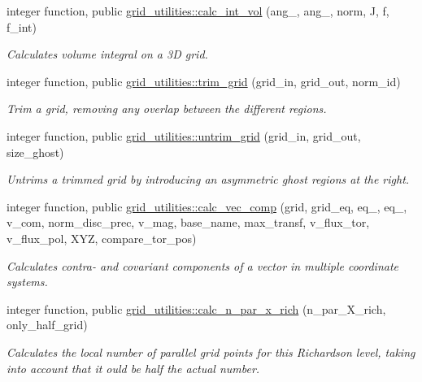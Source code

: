\begin{DoxyCompactItemize}
integer function, public \hyperlink{namespacegrid__utilities_a97e3106dbdc10b726af74afa113ba533}{grid\+\_\+utilities\+::calc\+\_\+int\+\_\+vol} (ang\+\_, ang\+\_, norm, J, f, f\+\_\+int)
\begin{DoxyCompactList}\small\item\em Calculates volume integral on a 3D grid. \end{DoxyCompactList}\item 
integer function, public \hyperlink{namespacegrid__utilities_a67001ff9bbcad707aacf17f90a748d90}{grid\+\_\+utilities\+::trim\+\_\+grid} (grid\+\_\+in, grid\+\_\+out, norm\+\_\+id)
\begin{DoxyCompactList}\small\item\em Trim a grid, removing any overlap between the different regions. \end{DoxyCompactList}\item 
integer function, public \hyperlink{namespacegrid__utilities_a4679f24af8e02793070f4e27b43e00b6}{grid\+\_\+utilities\+::untrim\+\_\+grid} (grid\+\_\+in, grid\+\_\+out, size\+\_\+ghost)
\begin{DoxyCompactList}\small\item\em Untrims a trimmed grid by introducing an asymmetric ghost regions at the right. \end{DoxyCompactList}\item 
integer function, public \hyperlink{namespacegrid__utilities_ad3d9386b9abcb1a7e17369a1b3a3750d}{grid\+\_\+utilities\+::calc\+\_\+vec\+\_\+comp} (grid, grid\+\_\+eq, eq\+\_, eq\+\_, v\+\_\+com, norm\+\_\+disc\+\_\+prec, v\+\_\+mag, base\+\_\+name, max\+\_\+transf, v\+\_\+flux\+\_\+tor, v\+\_\+flux\+\_\+pol, X\+YZ, compare\+\_\+tor\+\_\+pos)
\begin{DoxyCompactList}\small\item\em Calculates contra-\/ and covariant components of a vector in multiple coordinate systems. \end{DoxyCompactList}\item 
integer function, public \hyperlink{namespacegrid__utilities_adeb8c22db4d419a278d6fcc68a34100c}{grid\+\_\+utilities\+::calc\+\_\+n\+\_\+par\+\_\+x\+\_\+rich} (n\+\_\+par\+\_\+\+X\+\_\+rich, only\+\_\+half\+\_\+grid)
\begin{DoxyCompactList}\small\item\em Calculates the local number of parallel grid points for this Richardson level, taking into account that it ould be half the actual number. \end{DoxyCompactList}\item 

\end{DoxyCompactItemize}
